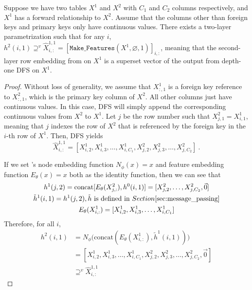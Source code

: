 \begin{lemma}
    \label{lem:forward}
    Suppose we have two tables $X^1$ and $X^2$ with $C_1$ and $C_2$ columns respectively, and $X^1$ has a forward relationship to $X^2$.  Assume that the columns other than foreign keys and primary keys only have continuous values. There exists a two-layer \model{} parametrization such that for any $i$, $h^{2}(i, 1) \supseteq^v \hat{X}^{1,1}_{i,:}=[\texttt{Make\_Features}(X^1, \varnothing, 1)]_{i,:}$, meaning that the second-layer row embedding from \model{} on $X^1$ is a superset vector of the output from depth-one DFS on $X^1$.
\end{lemma}

\begin{proof}
    Without loss of generality, we assume that $X^1_{:, 1}$ is a foreign key reference to $X^2_{:, 1}$, which is the primary key column of $X^2$. All other columns just have continuous values. In this case, DFS will simply append the corresponding continuous values from $X^2$ to $X^1$.
    Let $j$ be the row number such that $X^2_{j, 1} = X^1_{i, 1}$,
    meaning that $j$ indexes the row of $X^2$ that is referenced by the foreign key in the $i$-th row of $X^1$.  Then, DFS yields
    $$
    \hat{X}^{1,1}_{i,:} = [X^1_{i, 2}, X^1_{i, 3}, \ldots, X^1_{i,C_1}, X^2_{j, 2}, X^2_{j, 3}, \ldots, X^2_{j, C_2}]~.
    $$

    If we set \model{}'s node embedding function $N_\phi(x) = x$ and feature embedding function $E_\theta(x) = x$ both as the identity function, then we can see that
    \begin{gather*}
        h^1(j, 2)=\text{concat}[E_\theta(X^2_{j, :}), h^0(i, 1)]=[X^2_{j, 2}, \ldots, X^2_{j, C_2}, \Vec{0}] \\
        \tilde{h}^1(i, 1) = h^1(j, 2), \tilde{h} \text{ is defined in }Section \ref{sec:message_passing}  \\
        E_\theta(X^1_{i, :}) = [X^1_{i, 2}, X^1_{i, 3}, \ldots, X^1_{i,C_1}]
    \end{gather*}
    Therefore, for all $i$,
    $$
    \begin{aligned}
    h^2(i, 1) &= N_\phi\big(\text{concat}(E_\theta(X^1_{i, :}), \tilde{h}^1(i, 1))\big) \\
    &= [X^1_{i, 2}, X^1_{i, 3}, \ldots, X^1_{i,C_1}, X^2_{j, 2}, X^2_{j, 3}, \ldots, X^2_{j, C_2}, \Vec{0}] \\
    &\supseteq^v \hat{X}^{1,1}_{i,:}
    \end{aligned}
    $$
\end{proof}

